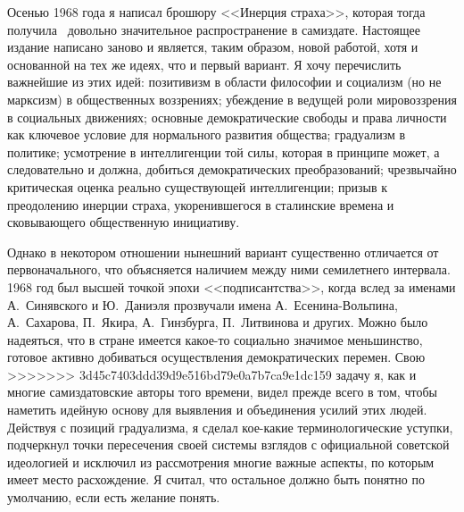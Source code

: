 \documentclass{book}
\begin{document}
Осенью 1968 года я написал брошюру <<Инерция страха>>, которая тогда получила  довольно значительное распространение в 
самиздате. Настоящее издание написано заново и яв­ляется, таким образом, новой работой, хотя и основанной на тех же идеях, что и 
первый вариант. Я хочу перечислить важнейшие из этих идей: позитивизм в области философии и социализм (но не марксизм) в 
общественных воззрениях; убеждение в ведущей роли мировоззрения в социальных движениях; основные демократические свободы и права 
личности как ключевое условие для нормального развития общества; градуализм в политике; усмотрение в интеллигенции той силы, 
которая в принципе может, а следовательно и должна, добиться демократических преобразований; чрезвычайно критическая оценка 
реально существующей интеллигенции; призыв к преодолению инерции страха, укоренившегося в сталинские времена и сковывающего 
общественную инициативу.

Однако в некотором отношении нынешний вариант существенно отличается от первоначального, что объясняется наличием между ними 
семилетнего интервала. 1968 год был высшей точкой эпохи <<подписантства>>, когда вслед за именами А.~Синявского и Ю.~Даниэля 
прозвучали имена А.~Есенина-Вольпина, А.~Сахарова, П.~Якира, А.~Гинзбурга, П.~Литвинова и других. Можно было надеяться, что в 
стране имеется какое-то социально значимое меньшинство, готовое активно добиваться осуществления демократических перемен. Свою 
>>>>>>> 3d45c7403ddd39d9e516bd79e0a7b7ca9e1dc159
задачу я, как и многие самиздатовские авторы того времени, видел прежде всего в том, чтобы наметить идейную основу для выявления 
и объединения усилий этих людей. Действуя с позиций градуализма, я сделал кое-какие терминологические уступки, подчеркнул точки 
пересечения своей системы взглядов с официальной советской идеологией и исключил из рассмотрения многие важные аспекты, по 
которым имеет место расхождение. Я считал, что остальное должно быть понятно по умолчанию, если есть желание понять.
\end{document}
